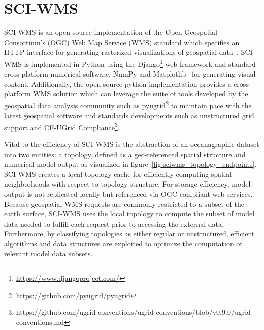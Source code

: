 \documentclass[11pt,twocolumn,twoside]{IEEEtran}
\newcommand{\ogc}{OGC}
\newcommand{\wms}{WMS}
\newcommand{\sciwms}{SCI-WMS}
\newcommand{\Sciwms}{SCI-WMS}
\begin{document}
\section{\sciwms{}}
\Sciwms{} is an open-source implementation of the Open Geospatial
Consortium's (\ogc{}) Web Map Service (\wms{}) standard which
specifies an HTTP interface for generating rasterized visualizations
of geospatial data~\cite{wms14}. \sciwms{} is implemented in Python
using the Django\footnote{\url{https://www.djangoproject.com/}} web
framework and standard cross-platform numerical software, NumPy and
Matplotlib~\cite{numpy11, hunter07} for generating visual
content. Additionally, the open-source python implementation provides
a cross-platform \wms{} solution which can leverage the suite of tools
developed by the geospatial data analysis community such as
pyugrid\footnote{https://github.com/pyugrid/pyugrid} to maintain pace
with the latest geospatial software and standards developments such as
unstructured grid support and CF-UGrid
Compliance\footnote{https://github.com/ugrid-conventions/ugrid-conventions/blob/v0.9.0/ugrid-conventions.md}.

Vital to the efficiency of \sciwms{} is the abstraction
of an oceanagraphic dataset into two entities: a topology, defined as
a geo-referenced spatial structure and numerical model output as
visualized in figure~\ref{fig:sciwms_topology_endpoints}. \Sciwms{}
creates a local topology cache for efficiently computing spatial
neighborhoods with respect to topology structure.  For storage
efficiency, model output is not replicated locally but referenced via
OGC compliant web-services. Because geospatial \wms{} requests are
commonly restricted to a subset of the earth surface, \sciwms{} uses
the local topology to compute the subset of model data needed to
fulfill each request prior to accessing the external
data. Furthermore, by classifying topologies as either regular or
unstructured, efficient algorithms and data structures are exploited
to optimize the computation of relevant model data subsets.
\end{document}
